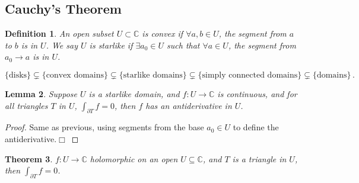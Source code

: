 \documentclass{article}
\theoremstyle{plain}\theoremheaderfont{\normalfont\itshape}\theorembodyfont{\rmfamily}\theoremseparator{.}\newtheorem*{rem}{Remark}\newtheorem*{ex}{Example}\newtheorem*{proof}{Proof}\newtheorem*{altp}{Alternative proof}\newtheorem*{con}{Consequences}\newtheorem*{notn}{Notations}\newtheorem*{cau}{Caution}\newtheorem*{term}{Terminology}\newtheorem*{keyex}{Key example}
\theoremstyle{plain}\theoremheaderfont{\normalfont\bfseries}\theorembodyfont{\rmfamily}\theoremseparator{.}\newtheorem{thm}{Theorem}[section]\newtheorem{lem}[thm]{Lemma}\newtheorem{prop}[thm]{Proposition}\newtheorem*{cor}{Corollary}\newtheorem{defn}[thm]{Definition}\newtheorem{clm}[thm]{Claim}\newtheorem{clminproof}{Claim}\newtheorem{leminproof}{Lemma}\newtheorem{app}{Application}
\theoremstyle{break}\theoremheaderfont{\normalfont\itshape}\theorembodyfont{\rmfamily}\theoremseparator{.\medskip}\newtheorem*{proofskip}{Proof}\newtheorem*{exs}{Examples}\newtheorem*{rems}{Remarks}\newtheorem*{rec}{Recall}\newtheorem*{ppts}{Properties}
\theoremstyle{break}\theoremheaderfont{\normalfont\bfseries}\theorembodyfont{\rmfamily}\theoremseparator{.\medskip}\newtheorem{lemskip}[thm]{Lemma}\newtheorem{defnskip}[thm]{Definition}\newtheorem{propskip}[thm]{Proposition}\newtheorem{thmskip}[thm]{Theorem}
\numberwithin{equation}{section}
\newcommand{\qed}{\hfill\ensuremath{\Box}}
\newcommand{\CC}{\mathbb{C}}
\begin{document}
    \subsection{Cauchy's Theorem}
    \begin{defn}
        An open subset \(U\subset\CC\) is \textit{convex} if \(\forall a,b\in U\), the segment from \(a\) to \(b\) is in \(U\). We say \(U\) is \textit{starlike} if \(\exists a_0\in U\) such that \(\forall a\in U\), the segment from \(a_0\to a\) is in \(U\).
    \end{defn}
    \[\{\text{disks}\}\subsetneq\{\text{convex domains}\}\subsetneq\{\text{starlike domains}\}\subsetneq\{\text{simply connected domains}\}\subsetneq\{\text{domains}\}\,.\]
    \begin{lem}
        Suppose \(U\) is a starlike domain, and \(f:U\to\CC\) is continuous, and for all triangles \(T\) in \(U\), \(\int_{\partial T}f=0\), then \(f\) has an antiderivative in \(U\).
    \end{lem}
    \begin{proof}
        Same as previous, using segments from the base \(a_0\in U\) to define the antiderivative.\qed
    \end{proof}
    \begin{thm}
        \(f:U\to\CC\) holomorphic on an open \(U\subseteq\CC\), and \(T\) is a triangle in \(U\), then \(\int_{\partial T}f=0\).
    \end{thm}
\end{document}
